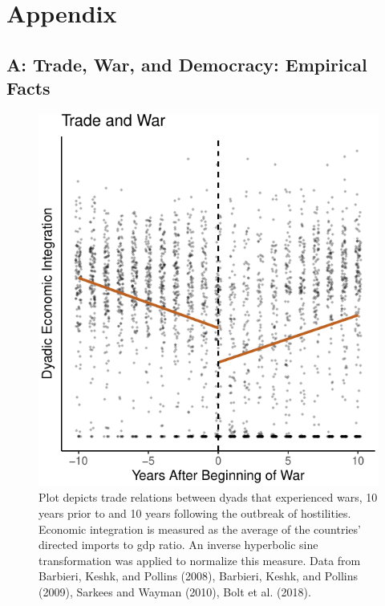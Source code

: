 \documentclass{puthesis}
\begin{document}
\clearpage

\section{Appendix}

\subsection{A: Trade, War, and Democracy: Empirical Facts}

\begin{figure}
\centering
\includegraphics{figure/tradeRD-1.pdf}
\caption{Plot depicts trade relations between dyads that experienced
wars, 10 years prior to and 10 years following the outbreak of
hostilities. Economic integration is measured as the average of the
countries' directed imports to gdp ratio. An inverse hyperbolic sine
transformation was applied to normalize this measure. Data from
Barbieri, Keshk, and Pollins (2008), Barbieri, Keshk, and Pollins
(2009), Sarkees and Wayman (2010), Bolt et al. (2018).
\label{fig:tradeRD}}
\end{figure}
\end{document}
